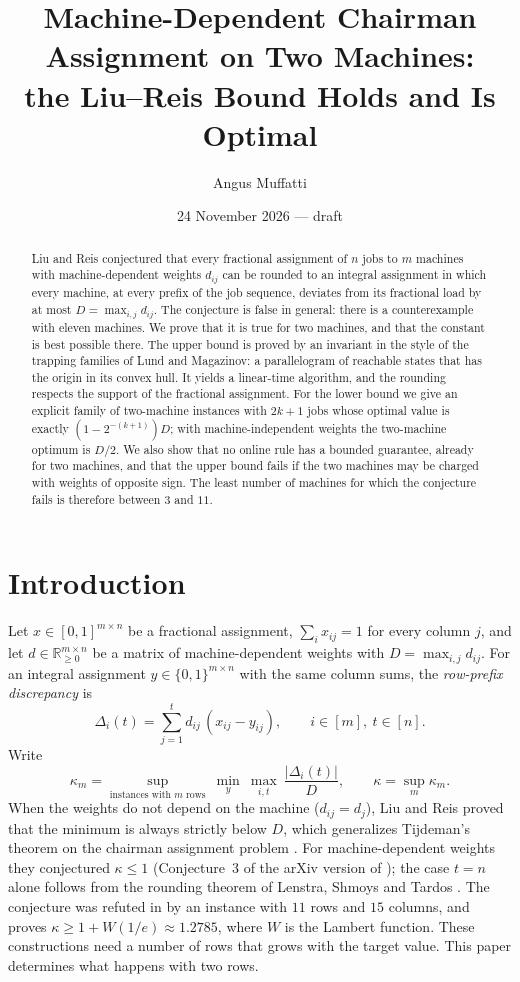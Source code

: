 \documentclass[11pt]{article}
\title{Machine-Dependent Chairman Assignment on Two Machines:\\
the Liu--Reis Bound Holds and Is Optimal}
\author{Angus Muffatti}
\date{24 November 2026 --- draft}
\theoremstyle{definition}
\newcommand{\R}{\mathbb{R}}
\newcommand{\disc}{\Delta}
\begin{document}
\maketitle

\begin{abstract}
Liu and Reis conjectured that every fractional assignment of $n$ jobs to
$m$ machines with machine-dependent weights $d_{ij}$ can be rounded to an
integral assignment in which every machine, at every prefix of the job
sequence, deviates from its fractional load by at most
$D=\max_{i,j}d_{ij}$.  The conjecture is false in general: there is a
counterexample with eleven machines.  We prove that it is true for two
machines, and that the constant is best possible there.  The upper bound
is proved by an invariant in the style of the trapping families of Lund
and Magazinov: a parallelogram of reachable states that has the origin in
its convex hull.  It yields a linear-time algorithm, and the rounding
respects the support of the fractional assignment.  For the lower bound
we give an explicit family of two-machine instances with $2k+1$ jobs whose
optimal value is exactly $(1-2^{-(k+1)})D$; with machine-independent
weights the two-machine optimum is $D/2$.  We also show that no online
rule has a bounded guarantee, already for two machines, and that the
upper bound fails if the two machines may be charged with weights of
opposite sign.  The least number of machines for which the conjecture
fails is therefore between $3$ and $11$.
\end{abstract}

\section{Introduction}

Let $x\in[0,1]^{m\times n}$ be a fractional assignment, $\sum_i x_{ij}=1$
for every column $j$, and let $d\in\R_{\ge0}^{m\times n}$ be a matrix of
machine-dependent weights with $D=\max_{i,j}d_{ij}$.  For an integral
assignment $y\in\{0,1\}^{m\times n}$ with the same column sums, the
\emph{row-prefix discrepancy} is
\[
 \disc_i(t)=\sum_{j=1}^{t}d_{ij}\,(x_{ij}-y_{ij}),\qquad
 i\in[m],\ t\in[n].
\]
Write
\[
 \kappa_m=\sup_{\text{instances with $m$ rows}}\ \min_{y}\ \max_{i,t}\
 \frac{|\disc_i(t)|}{D},\qquad \kappa=\sup_m\kappa_m .
\]
When the weights do not depend on the machine ($d_{ij}=d_j$), Liu and
Reis \citep{LiuReis2026} proved that the minimum is always strictly below
$D$, which generalizes Tijdeman's theorem on the chairman assignment
problem \citep{Tijdeman1973}.  For machine-dependent weights they
conjectured $\kappa\le1$ (Conjecture~3 of the arXiv version of
\citep{LiuReis2026}); the case $t=n$ alone follows from the rounding
theorem of Lenstra, Shmoys and Tardos \citep{LenstraShmoysTardos1990}.
The conjecture was refuted in \citep{Muffatti2026} by an instance with
$11$ rows and $15$ columns, and \citep{MuffattiChains2026} proves
$\kappa\ge1+W(1/e)\approx1.2785$, where $W$ is the Lambert function.
These constructions need a number of rows that grows with the target
value.  This paper determines what happens with two rows.
\end{document}
